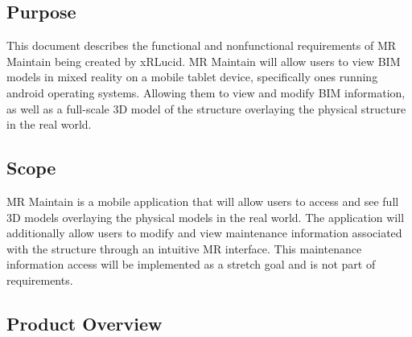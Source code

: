 \documentclass[onecolumn, draftclsnofoot,10pt, compsoc]{IEEEtran}
\begin{document}
    \subsection{Purpose}
    This document describes the functional and nonfunctional requirements of MR Maintain being created by xRLucid. MR Maintain will allow users to view BIM models in mixed reality on a mobile tablet device, specifically ones running android operating systems. Allowing them to view and modify BIM information, as well as a full-scale 3D model of the structure overlaying the physical structure in the real world.\par
    \subsection{Scope}
    MR Maintain is a mobile application that will allow users to access and see full 3D models overlaying the physical models in the real world. The application will additionally allow users to modify and view maintenance information associated with the structure through an intuitive MR interface. This maintenance information access will be implemented as a stretch goal and is not part of requirements.\par
        \subsection{Product Overview}
\end{document}

